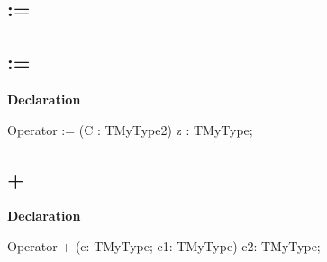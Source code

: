\documentclass{report}
\newif\ifpdf
\begin{document}
\subsection*{\large{\textbf{:=}}\normalsize\hspace{1ex}\hrulefill}
\else
\subsection*{:=}
\fi
\label{ok_operator_test-:=}
\index{:=}
\begin{list}{}{
\setlength{\itemindent}{0cm}
\setlength{\listparindent}{0cm}
\setlength{\leftmargin}{\evensidemargin}
\addtolength{\leftmargin}{\tmplength}
\settowidth{\labelsep}{X}
\addtolength{\leftmargin}{\labelsep}
\setlength{\labelwidth}{\tmplength}
}
\item[\textbf{Declaration}\hfill]
\ifpdf
\begin{flushleft}
\fi
\begin{ttfamily}
Operator := (C : TMyType2) z : TMyType;\end{ttfamily}

\ifpdf
\end{flushleft}
\fi

\end{list}
\ifpdf
\subsection*{\large{\textbf{+}}\normalsize\hspace{1ex}\hrulefill}
\else
\subsection*{+}
\fi
\label{ok_operator_test-+}
\index{+}
\begin{list}{}{
\setlength{\itemindent}{0cm}
\setlength{\listparindent}{0cm}
\setlength{\leftmargin}{\evensidemargin}
\addtolength{\leftmargin}{\tmplength}
\settowidth{\labelsep}{X}
\addtolength{\leftmargin}{\labelsep}
\setlength{\labelwidth}{\tmplength}
}
\item[\textbf{Declaration}\hfill]
\ifpdf
\begin{flushleft}
\fi
\begin{ttfamily}
Operator + (c: TMyType; c1: TMyType) c2: TMyType;\end{ttfamily}

\ifpdf
\end{flushleft}
\fi

\end{list}
\ifpdf
\end{document}
